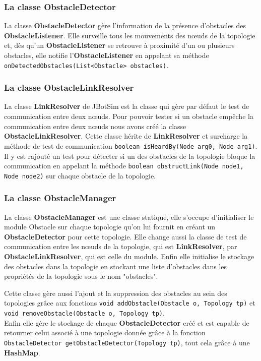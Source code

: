 \documentclass{article}
\begin{document}
\subsubsection{La classe ObstacleDetector}

La classe \textbf{ObstacleDetector} gère l'information de la présence d'obstacles des \textbf{ObstacleListener}. Elle surveille tous les mouvements des n\oe uds de la topologie et, dès qu'un \textbf{ObstacleListener} se retrouve à proximité d'un ou plusieurs obstacles, elle notifie l'\textbf{ObstacleListener} en appelant sa méthode \texttt{onDetectedObstacles(List<Obstacle> obstacles)}.

\subsubsection{La classe ObstacleLinkResolver}

La classe \textbf{LinkResolver} de JBotSim est la classe qui gère par défaut le test de communication entre deux n\oe uds.
Pour pouvoir tester si un obstacle empêche la communication entre deux n\oe uds nous avons créé la classe \textbf{ObstacleLinkResolver}.
Cette classe hérite de \textbf{LinkResolver} et surcharge la méthode de test de communication \texttt{boolean isHeardBy(Node arg0, Node arg1)}.
Il y est rajouté un test pour détecter si un des obstacles de la topologie bloque la communication en appelant la méthode \texttt{boolean obstructLink(Node node1, Node node2)} sur chaque obstacle de la topologie.

\subsubsection{La classe ObstacleManager}

La classe \textbf{ObstacleManager} est une classe statique, elle s'occupe d'initialiser le module Obstacle sur chaque topologie qu'on lui fournit en créant un \textbf{ObstacleDetector} pour cette topologie. Elle change aussi la classe de test de communication entre les n\oe uds de la topologie, qui est \textbf{LinkResolver}, par \textbf{ObstacleLinkResolver}, qui est celle du module. Enfin elle initialise le stockage des obstacles dans la topologie en stockant une liste d'obstacles dans les propriétés de la topologie sous le nom "obstacles".\medskip

Cette classe gère aussi l'ajout et la suppression des obstacles au sein des topologies grâce aux fonctions \texttt{void addObstacle(Obstacle o, Topology tp)}  et \texttt{void removeObsta\-cle(Obstacle o, Topology tp)}.\\
Enfin elle gère le stockage de chaque \textbf{ObstacleDetector} créé et est capable de retourner celui associé à une topologie donnée grâce à la fonction \texttt{ObstacleDe\-tector getObstacleDetector(Topology tp)}, tout cela grâce à une \textbf{HashMap}.
\end{document}
